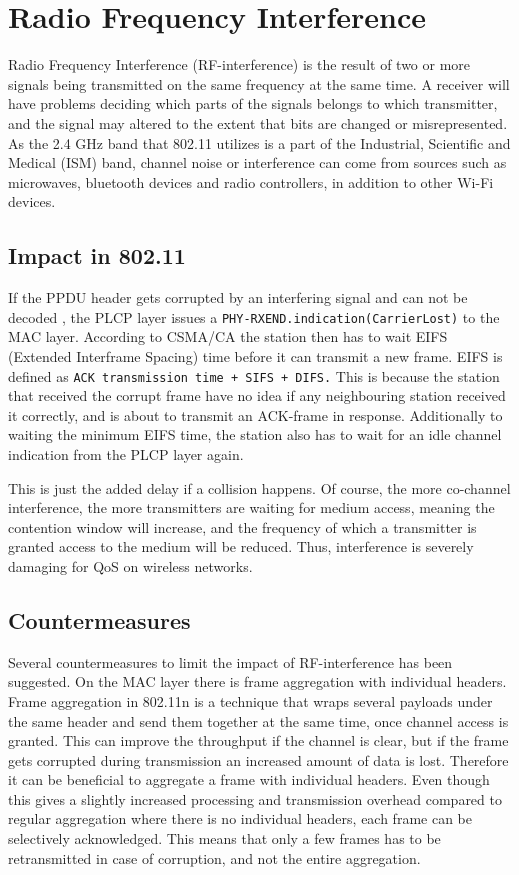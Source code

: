 	\section{Radio Frequency Interference}
	Radio Frequency Interference (RF-interference) is the result
	of two or more signals being transmitted on the same frequency at the same time.
	A receiver will have problems deciding which parts of the signals 
	belongs to which transmitter, and the signal may altered to the extent
	that bits are changed or misrepresented. As the 2.4 GHz band that 802.11
	utilizes is a part of the Industrial, Scientific and Medical (ISM) band, channel noise or interference
	can come from sources such as microwaves, bluetooth devices and radio controllers, in addition to other Wi-Fi devices. 

	\subsection{Impact in 802.11}
	If the PPDU header
	gets corrupted by an interfering signal and can not be decoded
	, the PLCP layer issues a \verb|PHY-RXEND.indication(CarrierLost)|
	to the MAC layer. According to CSMA/CA the station then has to
	wait EIFS (Extended Interframe Spacing) time before
	it can transmit a new frame. EIFS is defined as
	\verb|ACK transmission time + SIFS + DIFS.| This is because the station that received the corrupt frame have no idea if any neighbouring station
	received it correctly, and is about to transmit an ACK-frame in response. Additionally
	to waiting the minimum EIFS time, the station also has to wait for
	an idle channel indication from the PLCP layer again. 

	This is just the added delay if a collision happens. Of course, the more co-channel interference, the more transmitters are waiting for medium access, meaning
	the contention window will increase, and the frequency of which a transmitter is granted access to the medium will be reduced. Thus, interference is severely damaging for QoS on wireless networks.   %

	\subsection{Countermeasures}
	Several countermeasures to limit the impact of RF-interference has been suggested.
	On the MAC layer there is frame aggregation with individual headers.
	Frame aggregation in 802.11n is a technique that wraps several payloads under the same
	header and send them together at the same time, once channel access is granted. This can improve the throughput
	if the channel is clear, but if the frame gets corrupted during transmission
	an increased amount of data is lost.
	Therefore it can be beneficial to aggregate a frame with individual headers.
	Even though this gives a slightly increased processing and transmission overhead
	compared to regular aggregation where there is no individual headers, 
	each frame can be selectively acknowledged.
	This means that only a few frames has to be retransmitted in case of corruption,
	and not the entire aggregation. 

